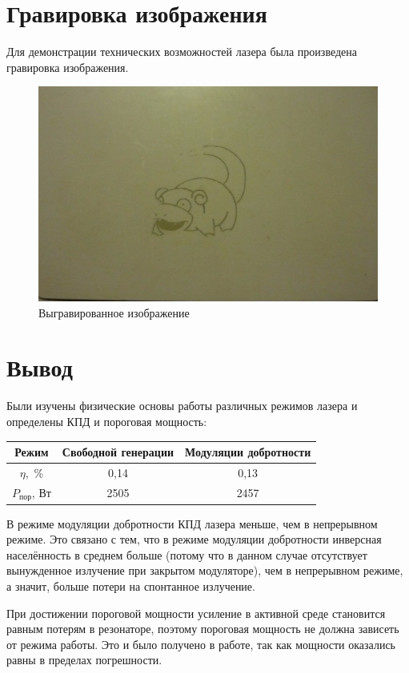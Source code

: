 \documentclass[a4paper, 12pt]{article}
\begin{document}
\section{Гравировка изображения}
Для демонстрации технических возможностей лазера была произведена гравировка изображения.
\begin{figure}[!htb]
	\centering
	\includegraphics[scale=0.4]{card.jpg}
	\caption{Выгравированное изображение}
\end{figure}
\section{Вывод}
Были изучены физические основы работы различных режимов лазера и определены КПД и пороговая мощность:
\begin{table}[h!]
		\centering
		\begin{tabular}{|c||c|c|}
			\hline
			Режим & Свободной генерации   & Модуляции добротности \\ 					\hline
			$\eta$,~\%   & 0,14 & 0,13 \\ \hline
			$P_{\text{пор}}$, Вт    & 2505 & 2457 \\
			\hline
		\end{tabular}
	\end{table}\par
	В режиме модуляции добротности КПД лазера меньше, чем в непрерывном режиме. Это связано с тем, что в режиме модуляции добротности инверсная населённость в среднем больше (потому что в данном случае отсутствует вынужденное излучение при закрытом модуляторе), чем в непрерывном режиме, а значит, больше потери на спонтанное излучение.\par
	При достижении пороговой мощности усиление в активной среде становится равным потерям в резонаторе, поэтому пороговая мощность не должна зависеть от режима работы. Это и было получено в работе, так как мощности оказались равны в пределах погрешности.
\end{document}
